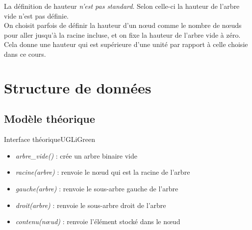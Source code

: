 \documentclass[10pt,firamath,cours]{nsi}
\begin{document}
\begin{remarque}[]
    La définition de hauteur \textit{ n'est pas standard}. Selon celle-ci la hauteur de l'arbre vide n'est pas définie.\\
    
    On choisit parfois de définir la hauteur d'un n\oe ud comme le nombre de n\oe uds pour aller jusqu'à la racine incluse, et on fixe la hauteur de l'arbre vide à zéro.\\
    
    Cela donne une hauteur qui est supérieure d'une unité par rapport à celle choisie dans ce cours.   
\end{remarque}


\begin{definition}
\end{definition}
\begin{definition}
\end{definition}






\section{Structure de données}
\subsection{Modèle théorique}
\begin{encadrecolore}{Interface théorique}{UGLiGreen}
    \begin{itemize}
        \item \textit{arbre\_vide()} : crée un arbre binaire vide
        \item \textit{racine(arbre)} : renvoie le n\oe ud qui est la racine de l'arbre
        \item  \textit{gauche(arbre)} : renvoie le sous-arbre gauche de l'arbre
        \item  \textit{droit(arbre)} : renvoie le sous-arbre droit de l'arbre
        \item \textit{contenu(n\oe ud)} : renvoie l'élément stocké dans le n\oe ud
    \end{itemize}
\end{encadrecolore}
\end{document}
